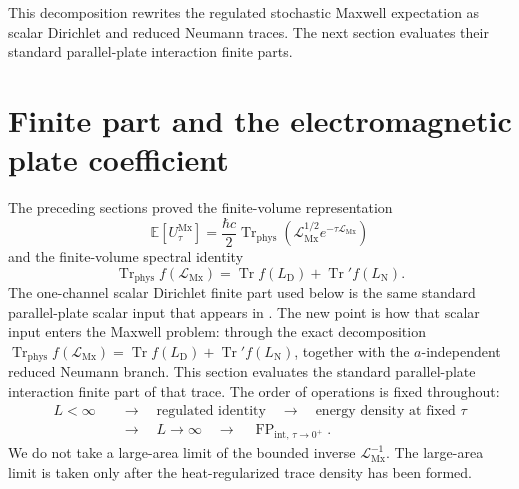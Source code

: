 \documentclass[11pt]{article}
\providecommand{\hbarc}{\hbar c}
\providecommand{\E}{\mathbb{E}}
\providecommand{\Tr}{\operatorname{Tr}}
\providecommand{\Trphys}{\operatorname{Tr}_{\mathrm{phys}}}
\providecommand{\FP}{\operatorname{FP}}
\providecommand{\paren}[1]{\left(#1\right)}
\providecommand{\LMx}{\mathcal L_{\mathrm{Mx}}}
\providecommand{\LD}{L_{\mathrm D}}
\providecommand{\LN}{L_{\mathrm N}}
\providecommand{\UtauMx}{U_{\tau}^{\mathrm{Mx}}}
\numberwithin{equation}{section}
\begin{document}
\begin{remark}
\label{rem:remaining-after-te-tm-section05}
This decomposition rewrites the regulated stochastic Maxwell expectation as
scalar Dirichlet and reduced Neumann traces.  The next section evaluates their
standard parallel-plate interaction finite parts.
\end{remark}
\section{Finite part and the electromagnetic plate coefficient}
\label{sec:finite-part-plate-result}

The preceding sections proved the finite-volume representation
\begin{equation}
\label{eq:section06-starting-point}
    \E[\UtauMx]
    =
    \frac{\hbarc}{2}\Trphys\paren{\LMx^{1/2}e^{-\tau\LMx}}
\end{equation}
and the finite-volume spectral identity
\begin{equation}
\label{eq:section06-maxwell-DN-trace-start}
    \Trphys f(\LMx)=\Tr f(\LD)+\Tr' f(\LN).
\end{equation}
The one-channel scalar Dirichlet finite part used below is the same standard
parallel-plate scalar input that appears in \cite{KhanKhan2026Scalar}.  The
new point is how that scalar input enters the Maxwell problem: through the
exact decomposition \(\Trphys f(\LMx)=\Tr f(\LD)+\Tr' f(\LN)\), together with
the \(a\)-independent reduced Neumann branch.
This section evaluates the standard parallel-plate interaction finite part of
that trace.  The order of operations is fixed throughout:
\begin{equation}
\label{eq:section06-order-of-operations}
\begin{aligned}
    L<\infty
    &\quad\longrightarrow\quad
    \text{regulated identity}
    \quad\longrightarrow\quad
    \text{energy density at fixed }\tau \\[2pt]
    &\quad\longrightarrow\quad
    L\to\infty
    \quad\longrightarrow\quad
    \FP_{\mathrm{int},\,\tau\to0^+}.
\end{aligned}
\end{equation}
We do not take a large-area limit of the bounded inverse \(\LMx^{-1}\).  The
large-area limit is taken only after the heat-regularized trace density has
been formed.
\end{document}
